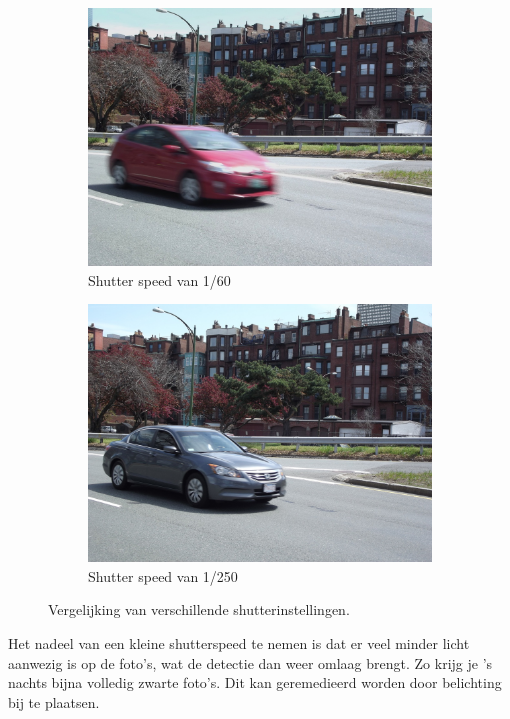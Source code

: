 \begin{figure}[h!]
	\centering
	\begin{subfigure}[b]{0.4\linewidth}
		\includegraphics[width=\linewidth]{img/shutter-slow.jpg}
		\caption{Shutter speed van 1/60}
	\end{subfigure}
	\begin{subfigure}[b]{0.4\linewidth}
		\includegraphics[width=\linewidth]{img/shutter-fast.jpg}
		\caption{Shutter speed van 1/250}
	\end{subfigure}
	\label{fig:ntlpc}
	\caption{Vergelijking van verschillende shutterinstellingen. \autocite{easy2019shutter}}
\end{figure}

Het nadeel van een kleine shutterspeed te nemen is dat er veel minder licht aanwezig is op de foto's, wat de detectie dan weer omlaag brengt. Zo krijg je 's nachts bijna volledig zwarte foto's. Dit kan geremedieerd worden door belichting bij te plaatsen.

